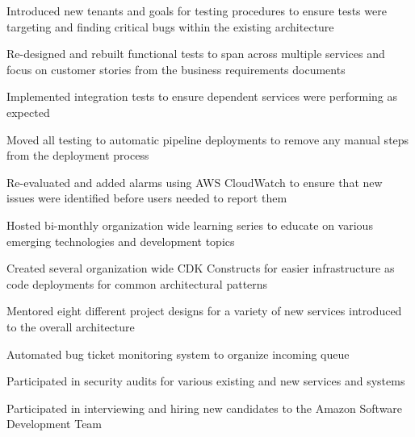 \documentclass[11pt, a4paper]{awesomecv}
\begin{document}
\begin{cventries}
{\begin{cvitems}
                    \item{Introduced new tenants and goals for testing procedures to ensure tests were targeting and finding critical bugs within the existing architecture}
                    \item{Re-designed and rebuilt functional tests to span across multiple services and focus on customer stories from the business requirements documents}
                    \item{Implemented integration tests to ensure dependent services were performing as expected}
                    \item{Moved all testing to automatic pipeline deployments to remove any manual steps from the deployment process}
                    \item{Re-evaluated and added alarms using AWS CloudWatch to ensure that new issues were identified before users needed to report them}
                    \item{Hosted bi-monthly organization wide learning series to educate on various emerging technologies and development topics}
                    \item{Created several organization wide CDK Constructs for easier infrastructure as code deployments for common architectural patterns}
                    \item{Mentored eight different project designs for a variety of new services introduced to the overall architecture}
                    \item{Automated bug ticket monitoring system to organize incoming queue}
                    \item{Participated in security audits for various existing and new services and systems}
                    \item{Participated in interviewing and hiring new candidates to the Amazon Software Development Team}

\end{cvitems}}
\end{cventries}
\end{document}
